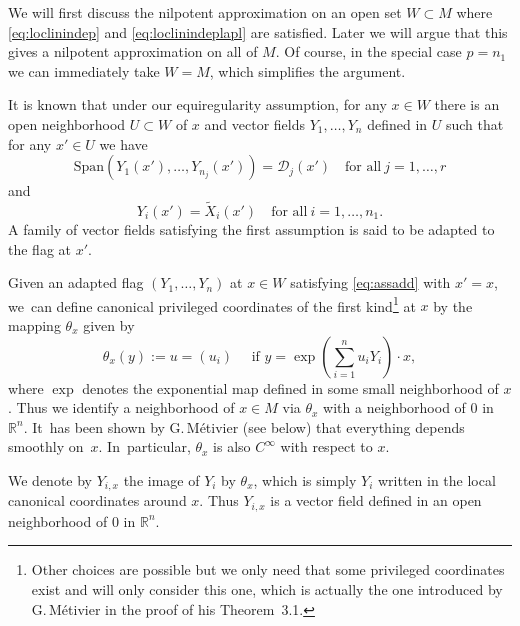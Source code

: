 \documentclass[JEP,XML,SOM,Unicode,published]{cedram}
\theoremstyle{definition}
\newcommand{\1}{\mathbbm{1}}
\newcommand{\R}{\mathbb{R}}
\begin{document}
We will first discuss the nilpotent approximation on an open set $W\subset M$ where \eqref{eq:loclinindep} and \eqref{eq:loclinindeplapl} are satisfied. Later we will argue that this gives a nilpotent approximation on all of $M$. Of course, in the special case $p=n_1$ we can immediately take $W=M$, which simplifies the argument.

It is known that under our equiregularity assumption, for any $x\in W$ there is an open neighborhood $U\subset W$ of $x$ and vector fields $Y_1,\ldots,Y_n$ defined in $U$ such that for any $x'\in U$ we have
\[
\text{Span}(Y_1(x'),\ldots,Y_{n_j}(x'))=\mathcal{D}_j(x')
\quad\text{for all}\ j=1,\ldots, r
\]
and
\begin{equation}\label{eq:assadd}
Y_i(x') =\tilde X_i(x') \quad\text{for all}\ i=1,\ldots,n_1.
\end{equation}
A family of vector fields satisfying the first assumption is said to be adapted to the flag at $x'$.

Given an adapted flag $(Y_1,\ldots,Y_n)$ at $x\in W$ satisfying \eqref{eq:assadd} with $x'=x$, we~can define canonical privileged coordinates of the first kind\footnote{Other choices are possible but we only need that some privileged coordinates exist and will only consider this one, which is actually the one introduced by G.\,Métivier \cite{Me} in the proof of his Theorem~3.1.} at $x$ by the mapping $\theta_x$ given by
\begin{equation} \label{eq:pc}
\theta_x (y) := u = (u_{i}) \quad\mbox{ if } y = \exp (\sum_{i=1}^n u_{i}Y_i) \cdot x,
\end{equation} where $\exp$ denotes the exponential map defined in some small neighborhood of $x$.
Thus we identify a neighborhood of $x\in M$ via $\theta_x$ with a neighborhood of $0$ in $\mathbb R^n$. It~has been shown by G.\,Métivier (see below) that everything depends smoothly on~$x$. In~particular, $\theta_x$ is also $C^\infty$ with respect to $x$.

We denote by $Y_{i,x}$ the image of $Y_i$ by $\theta_x$,
which is simply $Y_i$ written in the local canonical coordinates around $x$. Thus $Y_{i,x}$ is a vector field defined in an open neighborhood of $0$ in $\R^n$.
\end{document}
